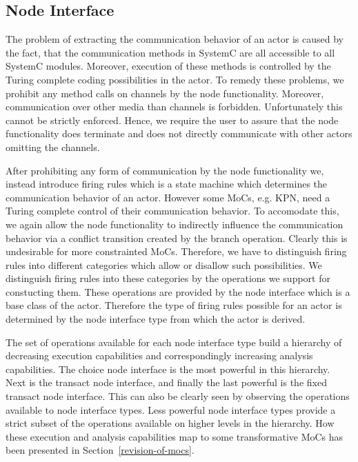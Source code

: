 \subsection{Node Interface}
The problem of extracting the communication behavior of an actor is caused
by the fact, that the communication methods in SystemC are all accessible
to all SystemC modules. Moreover, execution of these methods is controlled
by the Turing complete coding possibilities in the actor. To remedy these
problems, we prohibit any method calls on \SysteMoC{} channels
by the node functionality. Moreover,
communication over other media than \SysteMoC{} channels is forbidden.
Unfortunately this cannot be strictly enforced. Hence, we require the \SysteMoC{} user
to assure that the node functionality does terminate and does not
directly communicate with other actors omitting the \SysteMoC{} channels.

After prohibiting any form of communication by the node functionality we,
instead introduce firing rules which is a state machine which determines
the communication behavior of an actor. However some MoCs, e.g. KPN, need
a Turing complete control of their communication behavior. To
accomodate this, we again allow the node functionality to indirectly
influence the communication behavior via a conflict transition
created by the branch operation. Clearly this is undesirable for more
constrainted MoCs. Therefore, we have to distinguish firing rules into
different categories which allow or disallow such possibilities. We
distinguish firing rules into these categories by the operations we
support for constucting them. These operations are provided by the
node interface which is a base class of the actor. Therefore the
type of firing rules possible for an actor is determined by the
node interface type from which the actor is derived.


The set of operations available for each node interface type
build a hierarchy of decreasing execution capabilities and
correspondingly increasing analysis capabilities.
The choice node interface is the most powerful in this hierarchy.
Next is the transact node interface, and finally the last powerful is the
fixed transact node interface. This can also be clearly seen
by observing the operations available to node interface types.
Less powerful node interface types provide a strict subset of
the operations available on higher levels in the hierarchy.
How these execution and analysis capabilities map to some transformative
MoCs has been presented in Section~\ref{revision-of-mocs}.

